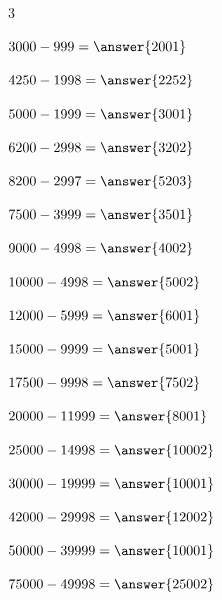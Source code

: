 \documentclass{ximera}
\begin{document}
\begin{oefening}{\oefB\ESS}
\begin{multicols}{3}
\begin{question} \(3000-999=\answer{2001}\) \end{question}

\begin{question} \(4250-1998=\answer{2252}\) \end{question}

\begin{question} \(5000-1999=\answer{3001}\) \end{question}

\begin{question} \(6200-2998=\answer{3202}\) \end{question}

\begin{question} \(8200-2997=\answer{5203}\) \end{question}

\begin{question} \(7500-3999=\answer{3501}\) \end{question}

\begin{question} \(9000-4998=\answer{4002}\) \end{question}

\begin{question} \(10000-4998=\answer{5002}\) \end{question}

\begin{question} \(12000-5999=\answer{6001}\) \end{question}

\begin{question} \(15000-9999=\answer{5001}\) \end{question}

\begin{question} \(17500-9998=\answer{7502}\) \end{question}

\begin{question} \(20000-11999=\answer{8001}\) \end{question}

\begin{question} \(25000-14998=\answer{10002}\) \end{question}

\begin{question} \(30000-19999=\answer{10001}\) \end{question}

\begin{question} \(42000-29998=\answer{12002}\) \end{question}

\begin{question} \(50000-39999=\answer{10001}\) \end{question}

\begin{question} \(75000-49998=\answer{25002}\) \end{question}

\end{multicols}

\end{oefening}
\end{document}
